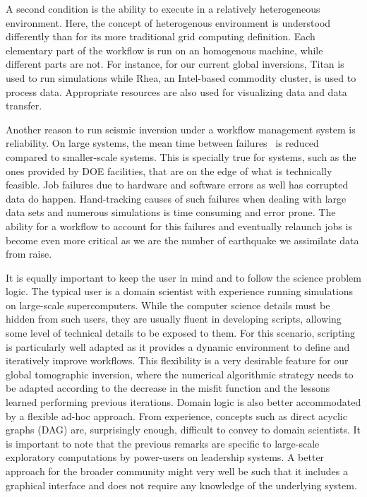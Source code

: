 A second condition is the ability to execute in a relatively heterogeneous
environment. Here, the concept of heterogenous environment is understood
differently than for its more traditional grid computing definition. Each
elementary part of the workflow is run on an homogenous machine, while different
parts are not. For instance, for our current global inversions, Titan is used
to run simulations while Rhea, an Intel-based commodity cluster, is used to
process data. Appropriate resources are also used for visualizing data and
data transfer.

Another reason to run seismic inversion under a workflow management system is
reliability. On large systems, the mean time between
failures~\cite{Cappello01112009} is reduced compared to smaller-scale systems.
This is specially true for systems, such as the ones provided by DOE facilities,
that are on the edge of what is technically feasible. Job failures due to
hardware and software errors as well has corrupted data do happen. Hand-tracking
causes of such failures when dealing with large data sets and numerous simulations
is time consuming and error prone. The ability for a workflow to account for
this failures and eventually relaunch jobs is become even more critical as we
are the number of earthquake we assimilate data from raise.

It is equally important to keep the user in mind and to follow the science
problem logic. The typical user is a domain scientist with experience running
simulations on large-scale supercomputers. While the computer science details
must be hidden from such users, they are usually fluent in developing scripts,
allowing some level of technical details to be exposed to them.
For this scenario, scripting is particularly well adapted as it provides a
dynamic environment to define and iteratively improve workflows. This
flexibility is a very desirable feature for our global tomographic inversion, where
the numerical algorithmic strategy needs to be adapted according to the decrease
in the misfit function and the lessons learned performing previous iterations.
Domain logic is also better accommodated by a flexible ad-hoc approach. From
experience, concepts such as direct acyclic graphs (DAG) are, surprisingly
enough, difficult to convey to domain scientists.
It is important to note that the previous remarks are specific to large-scale
exploratory computations by power-users on leadership systems. A better approach
for the broader community might very well be such that it includes a graphical
interface and does not require any knowledge of the underlying system.


